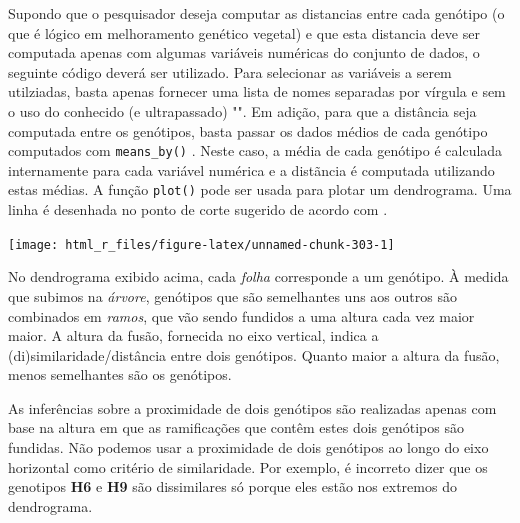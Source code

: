 \documentclass[
]{book}
\newenvironment{Shaded}{\begin{snugshade}}{\end{snugshade}}
\newcommand{\DataTypeTok}[1]{\textcolor[rgb]{0.13,0.29,0.53}{#1}}
\newcommand{\KeywordTok}[1]{\textcolor[rgb]{0.13,0.29,0.53}{\textbf{#1}}}
\newcommand{\NormalTok}[1]{#1}
\newcommand{\OperatorTok}[1]{\textcolor[rgb]{0.81,0.36,0.00}{\textbf{#1}}}
\newcommand{\OtherTok}[1]{\textcolor[rgb]{0.56,0.35,0.01}{#1}}
\newcommand{\StringTok}[1]{\textcolor[rgb]{0.31,0.60,0.02}{#1}}
\begin{document}
Supondo que o pesquisador deseja computar as distancias entre cada genótipo (o que é lógico em melhoramento genético vegetal) e que esta distancia deve ser computada apenas com algumas variáveis numéricas do conjunto de dados, o seguinte código deverá ser utilizado. Para selecionar as variáveis a serem utilziadas, basta apenas fornecer uma lista de nomes separadas por vírgula e sem o uso do conhecido (e ultrapassado) "". Em adição, para que a distância seja computada entre os genótipos, basta passar os dados médios de cada genótipo computados com \texttt{means\_by()} . Neste caso, a média de cada genótipo é calculada internamente para cada variável numérica e a distãncia é computada utilizando estas médias. A função \texttt{plot()} pode ser usada para plotar um dendrograma. Uma linha é desenhada no ponto de corte sugerido de acordo com \citet{Mojena1977}.

\begin{Shaded}
\end{Shaded}

\begin{center}\texttt{[image: html\_r\_files/figure-latex/unnamed-chunk-303-1]} \end{center}

No dendrograma exibido acima, cada \emph{folha} corresponde a um genótipo. À medida que subimos na \emph{árvore}, genótipos que são semelhantes uns aos outros são combinados em \emph{ramos}, que vão sendo fundidos a uma altura cada vez maior maior. A altura da fusão, fornecida no eixo vertical, indica a (di)similaridade/distância entre dois genótipos. Quanto maior a altura da fusão, menos semelhantes são os genótipos.

\begin{vcsabia}
As inferências sobre a proximidade de dois genótipos são realizadas apenas com base na altura em que as ramificações que contêm estes dois genótipos são fundidas. Não podemos usar a proximidade de dois genótipos ao longo do eixo horizontal como critério de similaridade. Por exemplo, é incorreto dizer que os genotipos \textbf{H6} e \textbf{H9} são dissimilares só porque eles estão nos extremos do dendrograma.
\end{vcsabia}
\end{document}
